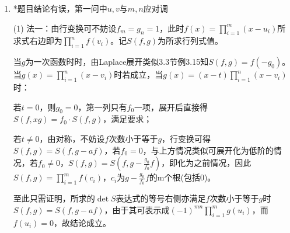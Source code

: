 \documentclass[a4paper,UTF8,fontset=windows]{ctexart}
\DeclareMathOperator{\diag}{diag}
\DeclareMathOperator{\tr}{tr}
\begin{document}
\begin{enumerate}
(2) 直接计算$\begin{pmatrix}g_1(y)&\cdots&g_n(y)\end{pmatrix}V$的第k个分量为$\sum_{i=1}^{n}{x_i^{k-1}\prod_{j\ne i}\frac{1-x_jy}{x_i-x_j}}$，其为关于$y$的不超过$n-1$次的多项式，分类讨论。当$x_t$中不含有0时，$y=\frac{1}{x_t}$时其值为$\frac{x_t^{k-1}}{x_t^{n-1}}$(求和中只有$i=t$这项不为0)，其已经被$n$个不同点处的值唯一确定(类似1.2节习题5)，而$y^{n-k}$满足要求，因此其只能为$y^{n-k}$。若有某个$x_i=0$，可考虑取极限逼近0或额外计算发现$y=0$时其余分量为0，最后一个分量为1。

(3) 直接代入可发现第一个等号成立。设$A=(x_i^{n-j})$，由(2)分每行考虑可知$(g_j(x_i))=AV^{-1}$，由$A=V\begin{pmatrix}&&1\\[-1ex]&\iddots&\\[-1ex]1&&\end{pmatrix}$，由2.1节定理2.2-6知$\tr=(g_j(x_i))=\tr(AV^{-1})=\tr(V^{-1}A)=\tr\begin{pmatrix}&&1\\[-1ex]&\iddots&\\[-1ex]1&&\end{pmatrix}$，因此$n$为奇数时为1，为偶数时为0。

(4) 类似(3)，原式$=(-1)^{n-1}\tr(f_j(-x_i))$，类似构造$A$知$(f_j(-x_i))=V\diag(1,-1,1,-1,\dots)V^{-1}$，由此原式$=(-1)^{n-1}\tr(\diag(1,-1,1,-1,\dots))$，因此$n$为奇数时为1，为偶数时为0。

\item
*题目结论有误，第一问中$u,v$与$m,n$应对调

(1) 法一：由行变换可不妨设$f_m=g_n=1$，此时$f(x)=\prod_{i=1}^{m}(x-u_i)$所求式右边即为$\prod_{i=1}^{n}f(v_i)$。记$S(f,g)$为所求行列式值。

当$g$为一次函数时时，由Laplace展开类似3.3节例3.15知$S(f,g)=f(-g_0)$。当$g(x)=\prod_{i=1}^{n}(x-v_i)$时若成立，当$g(x)=(x-t)\prod_{i=1}^{n}(x-v_i)$时：


若$t=0$，则$g_0=0$，第一列只有$f_0$一项，展开后直接得$S(f,xg)=f_0\cdot S(f,g)$，满足要求；

若$t\ne0$，由对称，不妨设$f$次数小于等于$g$，行变换可得$S(f,g)=S(f,g-af)$，若$f_0=0$，与上方情况类似可展开化为低阶的情况，若$f_0\ne0$，$S(f,g)=S\left(f,g-\frac{g_0}{f_0}f\right)$，即化为之前情况，因此$S(f,g)=\prod_{i=1}^{m}f(c_i)$，$c_i$为$g-\frac{g_0}{f_0}f$的m个根(包括0)。

至此只需证明，所求的$\det{S}$表达式的等号右侧亦满足$f$次数小于等于$g$时$S(f,g)=S(f,g-af)$，由于其可表示成$(-1)^{mn}\prod_{i=1}^{m}g(u_i)$，而$f(u_i)=0$，故结论成立。


\end{enumerate}
\end{document}
